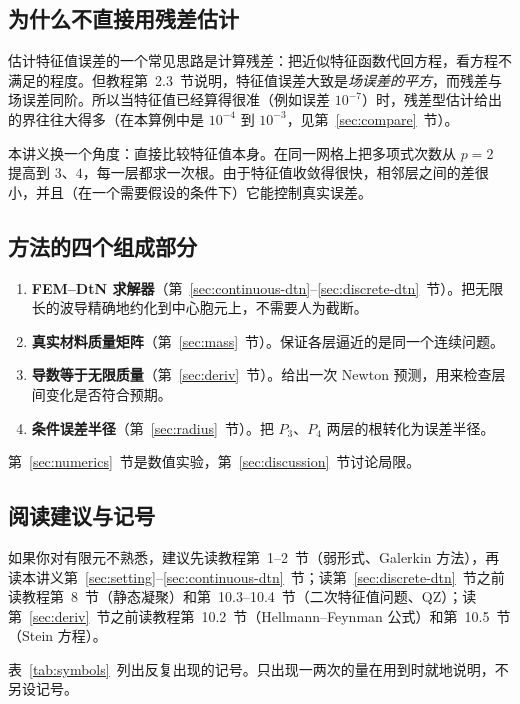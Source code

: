 \documentclass[11pt,a4paper,fontset=fandol]{ctexart}
\begin{document}
\subsection{为什么不直接用残差估计}

估计特征值误差的一个常见思路是计算残差：把近似特征函数代回方程，看方程不满足的程度。但教程第~2.3~节说明，特征值误差大致是\emph{场误差的平方}，而残差与场误差同阶。所以当特征值已经算得很准（例如误差 $10^{-7}$）时，残差型估计给出的界往往大得多（在本算例中是 $10^{-4}$ 到 $10^{-3}$，见第~\ref{sec:compare}~节）。

本讲义换一个角度：直接比较特征值本身。在同一网格上把多项式次数从 $p=2$ 提高到 $3$、$4$，每一层都求一次根。由于特征值收敛得很快，相邻层之间的差很小，并且（在一个需要假设的条件下）它能控制真实误差。

\subsection{方法的四个组成部分}

\begin{enumerate}
\item \textbf{FEM--DtN 求解器}（第~\ref{sec:continuous-dtn}--\ref{sec:discrete-dtn}~节）。把无限长的波导精确地约化到中心胞元上，不需要人为截断。
\item \textbf{真实材料质量矩阵}（第~\ref{sec:mass}~节）。保证各层逼近的是同一个连续问题。
\item \textbf{导数等于无限质量}（第~\ref{sec:deriv}~节）。给出一次 Newton 预测，用来检查层间变化是否符合预期。
\item \textbf{条件误差半径}（第~\ref{sec:radius}~节）。把 $P_3$、$P_4$ 两层的根转化为误差半径。
\end{enumerate}
第~\ref{sec:numerics}~节是数值实验，第~\ref{sec:discussion}~节讨论局限。

\subsection{阅读建议与记号}

如果你对有限元不熟悉，建议先读教程第~1--2~节（弱形式、Galerkin 方法），再读本讲义第~\ref{sec:setting}--\ref{sec:continuous-dtn}~节；读第~\ref{sec:discrete-dtn}~节之前读教程第~8~节（静态凝聚）和第~10.3--10.4~节（二次特征值问题、QZ）；读第~\ref{sec:deriv}~节之前读教程第~10.2~节（Hellmann--Feynman 公式）和第~10.5~节（Stein 方程）。

表~\ref{tab:symbols}~列出反复出现的记号。只出现一两次的量在用到时就地说明，不另设记号。
\end{document}
